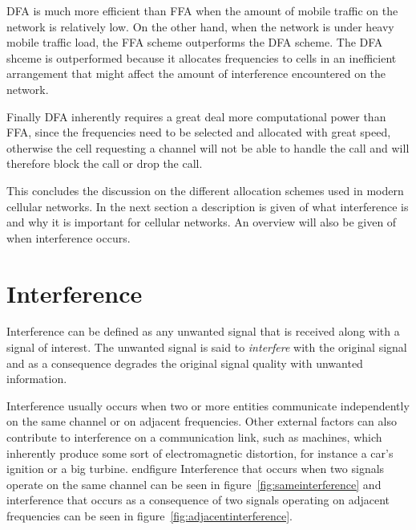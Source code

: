 \gls{DFA} is much more efficient than \gls{FFA} when the amount of mobile traffic on the network is relatively low\cite{PrinciplesMobileCommunication,WirelessCommunications}. On the other hand, when the network is under heavy mobile traffic load, the \gls{FFA} scheme outperforms the \gls{DFA} scheme\cite{WirelessCommunications}. The \gls{DFA} shceme is outperformed because it allocates frequencies to cells in an inefficient arrangement that might affect the amount of interference encountered on the network\cite{MobileWirelessCommunications}.

Finally \gls{DFA} inherently requires a great deal more computational power than \gls{FFA}, since the frequencies need to be selected and allocated with great speed, otherwise the cell requesting a channel will not be able to handle the call and will therefore block the call or drop the call\cite{PrinciplesMobileCommunication,WirelessCommunications}.


This concludes the discussion on the different allocation schemes used in modern cellular networks. In the next section a description is given of what interference is and why it is important for cellular networks. An overview will also be given of when interference occurs.

\section{Interference}
\label{sec:Interference}
Interference can be defined as any unwanted signal that is received along with a signal of interest\cite{WirelessDigitalCommunications}. The unwanted signal is said to \emph{interfere} with the original signal and as a consequence degrades the original signal quality with unwanted information\cite{WirelessDigitalCommunications}.

Interference usually occurs when two or more entities communicate independently on the same channel or on adjacent frequencies\cite{WirelessCommunications,WirelessDigitalCommunications}. Other external factors can also contribute to interference on a communication link, such as machines, which inherently produce some sort of electromagnetic distortion, for instance a car's ignition or a big turbine\cite{WirelessCommunications,WirelessDigitalCommunications}. 
end{figure}
Interference that occurs when two signals operate on the same channel can be seen in figure~\ref{fig:sameinterference} and interference that occurs as a consequence of two signals operating on adjacent frequencies can be seen in figure~\ref{fig:adjacentinterference}.

